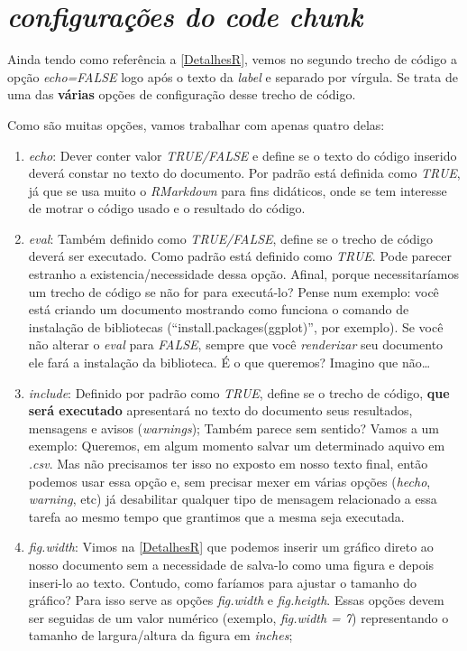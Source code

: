 \documentclass[]{book}
\providecommand{\tightlist}{%
  \setlength{\itemsep}{0pt}\setlength{\parskip}{0pt}}
\begin{document}
\hypertarget{codeChunkConf}{%
\chapter{\texorpdfstring{\emph{configurações do \textbf{code chunk} }}{configurações do code chunk }}\label{codeChunkConf}}

Ainda tendo como referência a \autoref{DetalhesR}, vemos no segundo trecho de código a opção \emph{echo=FALSE} logo após o texto da \emph{label} e separado por vírgula. Se trata de uma das \textbf{várias} opções de configuração desse trecho de código.

Como são muitas opções, vamos trabalhar com apenas quatro delas:

\begin{enumerate}
\def\labelenumi{\arabic{enumi}.}
\tightlist
\item
  \emph{echo}: Dever conter valor \emph{TRUE/FALSE} e define se o texto do código inserido deverá constar no texto do documento. Por padrão está definida como \emph{TRUE}, já que se usa muito o \emph{RMarkdown} para fins didáticos, onde se tem interesse de motrar o código usado e o resultado do código.\\
\item
  \emph{eval}: Também definido como \emph{TRUE/FALSE}, define se o trecho de código deverá ser executado. Como padrão está definido como \emph{TRUE}. Pode parecer estranho a existencia/necessidade dessa opção. Afinal, porque necessitaríamos um trecho de código se não for para executá-lo? Pense num exemplo: você está criando um documento mostrando como funciona o comando de instalação de bibliotecas (``install.packages(ggplot)'', por exemplo). Se você não alterar o \emph{eval} para \emph{FALSE}, sempre que você \emph{renderizar} seu documento ele fará a instalação da biblioteca. É o que queremos? Imagino que não\ldots{}\\
\item
  \emph{include}: Definido por padrão como \emph{TRUE}, define se o trecho de código, \textbf{que será executado} apresentará no texto do documento seus resultados, mensagens e avisos (\emph{warnings}); Também parece sem sentido? Vamos a um exemplo: Queremos, em algum momento salvar um determinado aquivo em \emph{.csv}. Mas não precisamos ter isso no exposto em nosso texto final, então podemos usar essa opção e, sem precisar mexer em várias opções (\emph{hecho}, \emph{warning}, etc) já desabilitar qualquer tipo de mensagem relacionado a essa tarefa ao mesmo tempo que grantimos que a mesma seja executada.\\
\item
  \emph{fig.width}: Vimos na \autoref{DetalhesR} que podemos inserir um gráfico direto ao nosso documento sem a necessidade de salva-lo como uma figura e depois inseri-lo ao texto. Contudo, como faríamos para ajustar o tamanho do gráfico? Para isso serve as opções \emph{fig.width} e \emph{fig.heigth}. Essas opções devem ser seguidas de um valor numérico (exemplo, \emph{fig.width = 7}) representando o tamanho de largura/altura da figura em \emph{inches};
\end{enumerate}
\end{document}
